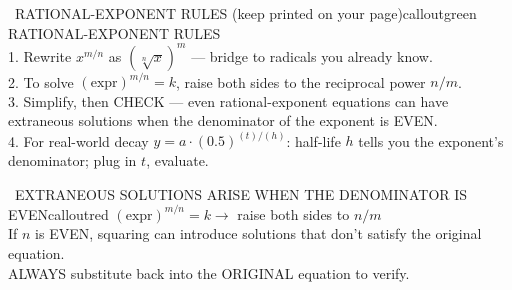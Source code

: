 \documentclass[11pt]{article}
\begin{document}
\begin{callout}{\IconBook\ RATIONAL-EXPONENT RULES (keep printed on your page)}{calloutgreen}
RATIONAL-EXPONENT RULES\\
1. Rewrite \(x^{m/n}\) as \((\sqrt[n]{x})^m\) — bridge to radicals you already know.\\
2. To solve \((\text{expr})^{m/n} = k\), raise both sides to the reciprocal power \(n/m\).\\
3. Simplify, then CHECK — even rational-exponent equations can have extraneous solutions when the denominator of the exponent is EVEN.\\
4. For real-world decay \(y = a\cdot(0.5)^{(t)/(h)}\): half-life \(h\) tells you the exponent's denominator; plug in \(t\), evaluate.
\end{callout}

\begin{callout}{\IconWarn\ EXTRANEOUS SOLUTIONS ARISE WHEN THE DENOMINATOR IS EVEN}{calloutred}
\((\text{expr})^{m/n} = k \rightarrow\) raise both sides to \(n/m\)\\
If \(n\) is EVEN, squaring can introduce solutions that don't satisfy the original equation.\\
ALWAYS substitute back into the ORIGINAL equation to verify.
\end{callout}
\end{document}
